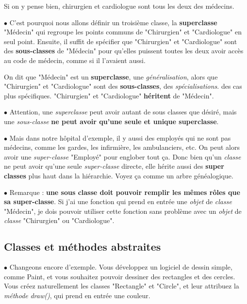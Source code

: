 Si on y pense bien, chirurgien et cardiologue sont tous les deux des médecins.

\par $\bullet$ C'est pourquoi nous allons définir un troisième classe, la \textbf{superclasse} "Médecin" qui regroupe les points communs de "Chirurgien" et "Cardiologue" en seul point. Ensuite, il suffit de spécifier que "Chirurgien" et "Cardiologue" sont des \textbf{sous-classes} de "Médecin" pour qu'elles puissent toutes les deux avoir accès au code de médecin, comme si il l'avaient aussi.

On dit que "Médecin" est un \textbf{superclasse}, une \textit{généralisation}, alors que "Chirurgien" et "Cardiologue" sont des \textbf{sous-classes}, des \textit{spécialisations}. des cas plus spécifiques. "Chirurgien" et "Cardiologue" \textbf{héritent} de "Médecin".

\par $\bullet$ Attention, une \textit{superclasse} peut avoir autant de sous classes que désiré, mais une \textit{sous-classe} \textbf{ne peut avoir qu'une seule et unique superclasse}.

\par $\bullet$ Mais dans notre hôpital d'exemple, il y aussi des employés qui ne sont pas médecins, comme les gardes, les infirmière, les ambulanciers, etc. On peut alors avoir une \textit{super-classe} "Employé" pour englober tout ça. Donc bien qu'un \textit{classe} ne peut avoir qu'une seule \textit{super-classe} directe, elle hérite aussi des \textbf{super classes} plus haut dans la hiérarchie. Voyez ça comme un arbre généalogique.

\par $\bullet$ Remarque : \textbf{une sous classe doit pouvoir remplir les mêmes rôles que sa super-classe}. Si j'ai une fonction qui prend en entrée une \textit{objet} de \textit{classe} "Médecin", je dois pouvoir utiliser cette fonction sans problème avec un \textit{objet} de \textit{classe} "Chirurgien" ou "Cardiologue".

\newpage
\subsection{Classes et méthodes abstraites}

\par $\bullet$ Changeons encore d'exemple. Vous développez un logiciel de dessin simple, comme Paint, et vous souhaitez pouvoir dessiner des rectangles et des cercles. Vous créez naturellement les classes "Rectangle" et "Circle", et leur attribuez la \textit{méthode} \textit{draw()}, qui prend en entrée une couleur.\\

